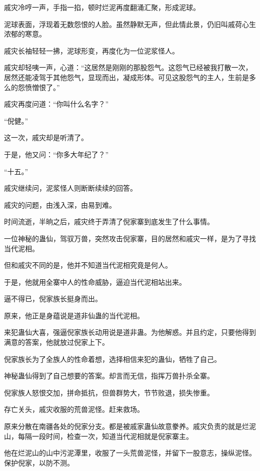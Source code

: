 
\begin{this_body}

戚灾冷哼一声，手指一掐，顿时烂泥再度翻涌汇聚，形成泥球。

泥球表面，浮现着无数怨恨的人脸。虽然静默无声，但此情此景，仍旧叫戚荷心生浓郁的寒意。

戚灾长袖轻轻一拂，泥球形变，再度化为一位泥浆怪人。

戚灾却轻咦一声，心道：“这居然是刚刚的那股怨气。这怨气已经被我打散一次，居然还能凌驾于其他怨气，显现而出，凝成形体。可见这股怨气的主人，生前是多么的怨愤憎恨了。”

戚灾再度问道：“你叫什么名字？”

“倪健。”

这一次，戚灾却是听清了。

于是，他又问：“你多大年纪了？”

“十五。”

戚灾继续问，泥浆怪人则断断续续的回答。

戚灾的问题，由浅入深，由易到难。

时间流逝，半晌之后，戚灾终于弄清了倪家寨到底发生了什么事情。

一位神秘的蛊仙，驾驭万兽，突然攻击倪家寨，目的居然和戚灾一样，是为了寻找当代泥相。

但和戚灾不同的是，他并不知道当代泥相究竟是何人。

于是，他就用全寨中人的性命威胁，逼迫当代泥相站出来。

逼不得已，倪家族长挺身而出。

原来，他正是身蕴说是道非仙蛊的当代泥相。

来犯蛊仙大喜，强逼倪家族长动用说是道非蛊。为他解惑。并且约定，只要他得到满意的答案，他就放过倪家上下。

倪家族长为了全族人的性命着想，选择相信来犯的蛊仙，牺牲了自己。

神秘蛊仙得到了自己想要的答案。却言而无信，指挥万兽扑杀全寨。

倪家族人怒恨交加，拼命抵抗，但兽群势大，节节败退，损失惨重。

存亡关头，戚灾收服的荒兽泥怪。赶来救场。

原来分散在南疆各处的倪家分支。都是被戚家蛊仙故意豢养。戚灾负责的就是烂泥山，每隔一段时间，检查一次，知道当代泥相就是倪家寨主。

他在烂泥山的山中污泥潭里，收服了一头荒兽泥怪，并留下一股意志，操纵泥怪。保护倪家，以防不测。


\end{this_body}
